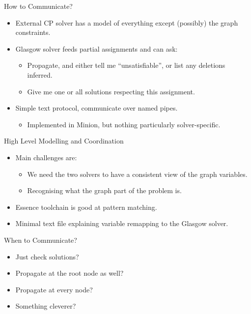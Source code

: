 \documentclass{beamer}
\begin{document}
\begin{frame}{How to Communicate?}
    \begin{itemize}
        \item External CP solver has a model of everything except (possibly) the graph constraints.
        \item Glasgow solver feeds partial assignments and can ask:
            \begin{itemize}
                \item Propagate, and either tell me ``unsatisfiable'', or list any deletions inferred.
                \item Give me one or all solutions respecting this assignment.
            \end{itemize}
        \item Simple text protocol, communicate over named pipes.
            \begin{itemize}
                \item Implemented in Minion, but nothing particularly solver-specific.
            \end{itemize}
    \end{itemize}
\end{frame}

\begin{frame}{High Level Modelling and Coordination}
    \begin{itemize}
        \item Main challenges are:
            \begin{itemize}
                \item We need the two solvers to have a consistent view of the graph variables.
                \item Recognising what the graph part of the problem is.
            \end{itemize}
        \item Essence toolchain is good at pattern matching.
        \item Minimal text file explaining variable remapping to the Glasgow solver.
    \end{itemize}
\end{frame}

\begin{frame}{When to Communicate?}
    \begin{itemize}
        \item Just check solutions?
        \item Propagate at the root node as well?
        \item Propagate at every node?
        \item Something cleverer?
    \end{itemize}
\end{frame}
\end{document}

